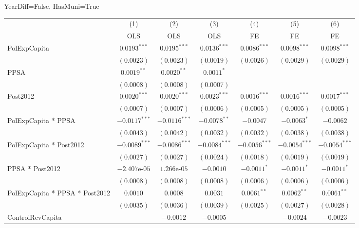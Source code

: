\begin{table}[H]
    \centering
    \scriptsize
    \begin{minipage}{\textwidth}
    \centering
    {\normalsize YearDiff=False, HasMuni=True}
    \vspace{6pt}
    \begin{tabular}{lcccccc}
        \toprule
         & (1) & (2) & (3) & (4) & (5) & (6) \\
         & OLS & OLS & OLS & FE & FE & FE \\
        \midrule
        PolExpCapita & $0.0193^{***}$ & $0.0195^{***}$ & $0.0136^{***}$ & $0.0086^{***}$ & $0.0098^{***}$ & $0.0098^{***}$ \\
         & $(0.0023)$ & $(0.0023)$ & $(0.0019)$ & $(0.0026)$ & $(0.0029)$ & $(0.0029)$ \\[4pt]
        PPSA & $0.0019^{**}$ & $0.0020^{**}$ & $0.0011^{*}$ &  &  &  \\
         & $(0.0008)$ & $(0.0008)$ & $(0.0007)$ &  &  &  \\[4pt]
        Post2012 & $0.0020^{***}$ & $0.0020^{***}$ & $0.0023^{***}$ & $0.0016^{***}$ & $0.0016^{***}$ & $0.0017^{***}$ \\
         & $(0.0007)$ & $(0.0007)$ & $(0.0006)$ & $(0.0005)$ & $(0.0005)$ & $(0.0005)$ \\[4pt]
        PolExpCapita * PPSA & $-0.0117^{***}$ & $-0.0116^{***}$ & $-0.0078^{**}$ & $-0.0047$ & $-0.0063^{*}$ & $-0.0062$ \\
         & $(0.0043)$ & $(0.0042)$ & $(0.0032)$ & $(0.0032)$ & $(0.0038)$ & $(0.0038)$ \\[4pt]
        PolExpCapita * Post2012 & $-0.0089^{***}$ & $-0.0086^{***}$ & $-0.0084^{***}$ & $-0.0056^{***}$ & $-0.0054^{***}$ & $-0.0054^{***}$ \\
         & $(0.0027)$ & $(0.0027)$ & $(0.0024)$ & $(0.0018)$ & $(0.0019)$ & $(0.0019)$ \\[4pt]
        PPSA * Post2012 & $-2.407\text{e-}05$ & $1.266\text{e-}05$ & $-0.0010$ & $-0.0011^{*}$ & $-0.0011^{*}$ & $-0.0011^{*}$ \\
         & $(0.0008)$ & $(0.0008)$ & $(0.0008)$ & $(0.0006)$ & $(0.0006)$ & $(0.0006)$ \\[4pt]
        PolExpCapita * PPSA * Post2012 & $0.0010$ & $0.0008$ & $0.0031$ & $0.0061^{**}$ & $0.0062^{**}$ & $0.0061^{**}$ \\
         & $(0.0035)$ & $(0.0036)$ & $(0.0039)$ & $(0.0025)$ & $(0.0027)$ & $(0.0028)$ \\[4pt]
        ControlRevCapita &  & $-0.0012$ & $-0.0005$ &  & $-0.0024$ & $-0.0023$ \\

\end{tabular}
\end{minipage}
\end{table}
